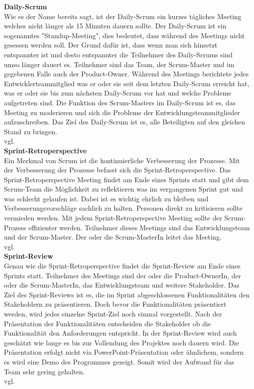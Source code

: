 		\textbf{Daily-Scrum} \\
		Wie es der Name bereits sagt, ist der Daily-Scrum ein kurzes tägliches Meeting welches nicht länger als 15 Minuten dauern sollte. Der Daily-Scrum ist ein sogenanntes "Standup-Meeting", dies bedeutet, dass während des Meetings nicht gesessen werden soll. Der Grund dafür ist, dass wenn man sich hinsetzt entspannter ist und desto entspannter die Teilnehmer des Daily-Scrums sind umso länger dauert es. 
		Teilnehmer sind das Team, der Scrum-Master und im gegebenen Falle auch der Product-Owner. Während des Meetings berichtete jedes Entwicklerteammitglied was er oder sie seit dem letzten Daily-Scrum erreicht hat, was er oder sie bis zum nächsten Daily-Scrum vor hat und welche Probleme aufgetreten sind. Die Funktion des Scrum-Masters im Daily-Scrum ist es, das Meeting zu moderieren und sich die Probleme der Entwicklungsteammitglieder aufzuschreiben.
		Das Ziel des Daily-Scrum ist es, alle Beteiligten auf den gleichen Stand zu bringen.\\vgl. \textcite{ScrumDailyScrum} \\
		
		\textbf{Sprint-Retroperspective} \\
		Ein Merkmal von Scrum ist die kontinuierliche Verbesserung der Prozesse. Mit der Verbesserung der Prozesse befasst sich die Sprint-Retroperspective. Das Sprint-Retroperspective Meeting findet am Ende eines Sprints statt und gibt dem Scrum-Team die Möglichkeit zu reflektieren was im vergangenen Sprint gut und was schlecht gelaufen ist. Dabei ist es wichtig ehrlich zu bleiben und Verbesserungsvorschläge sachlich zu halten. Personen direkt zu kritisieren sollte vermieden werden. Mit jedem Sprint-Retroperspective Meeting sollte der Scrum-Prozess effizienter werden. 
		Teilnehmer dieses Meetings sind das Entwicklungsteam und der Scrum-Master. Der oder die Scrum-MasterIn leitet das Meeting.\\vgl. \textcite{ScrumScrum-Retroperspective} \\
		
		\textbf{Sprint-Review} \\
		Genau wie die Sprint-Retroperspective findet die Sprint-Review am Ende eines Sprints statt. Teilnehmer des Meetings sind der oder die Product-OwnerIn, der oder die Scrum-MasterIn, das Entwicklungsteam und weitere Stakeholder. Das Ziel des Sprint-Reviews ist es, die im Sprint abgeschlossenen Funktionalitäten den Stakeholdern zu präsentieren. Doch bevor die Funktionalitäten präsentiert werden, wird jedes einzelne Sprint-Ziel noch einmal vorgestellt. Nach der Präsentation der Funktionalitäten entscheiden die Stakeholder ob die Funktionalität den Anforderungen entspricht. In der Sprint-Review wird auch geschätzt wie lange es bis zur Vollendung des Projektes noch dauern wird.
		Die Präsentation erfolgt nicht via PowerPoint-Präsentation oder ähnlichem, sondern es wird eine Demo des Programmes gezeigt. Somit wird der Aufwand für das Team sehr gering gehalten.\\vgl. \textcite{ScrumScrum-Review} \\
		
